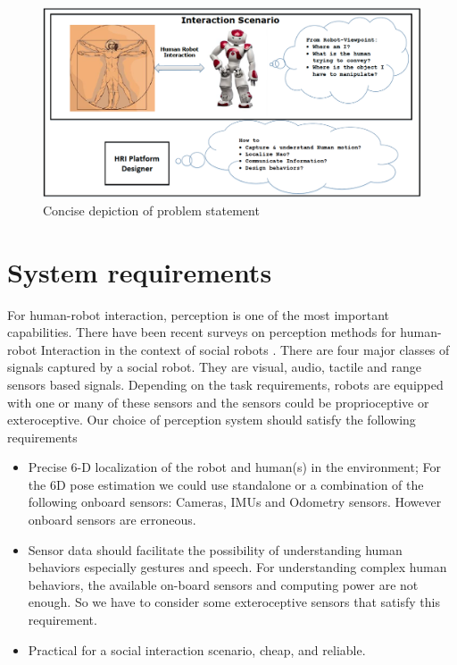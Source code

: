 \begin{figure}[H]
\centering
\includegraphics[width=\textwidth]{assets/ProblemStatement.png}
\caption{Concise depiction of problem statement}
\label{fig:problemstatement}
\end{figure}%

\section{System requirements}
For human-robot interaction, perception is one of the most important capabilities. There have been recent surveys on perception methods for human-robot Interaction in the context of social robots \cite{yan2014survey}. There are four major classes of signals captured by a social robot. They are visual, audio, tactile and range sensors based signals. Depending on the task requirements, robots are equipped with one or many of these sensors and the sensors could be proprioceptive or exteroceptive. 
Our choice of perception system should satisfy the following requirements
\begin{itemize}
\item Precise 6-D localization of the robot and human(s) in the environment; For the 6D pose estimation we could use standalone or a combination of the following onboard sensors: Cameras, IMUs and Odometry sensors. However onboard sensors are erroneous.
\item Sensor data should facilitate the possibility of understanding human behaviors especially gestures and speech. For understanding complex human behaviors, the available on-board sensors and computing power are not enough. So we have to consider some exteroceptive sensors that satisfy this requirement. 
\item Practical for a social interaction scenario, cheap, and reliable.
\end{itemize}

